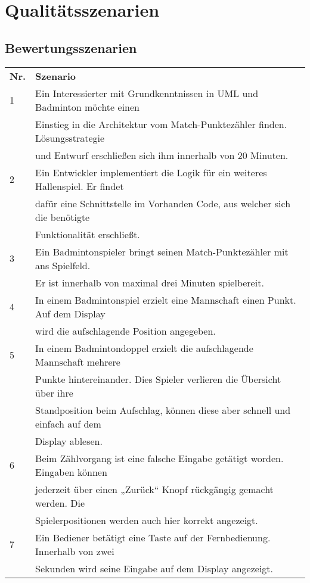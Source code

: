 \chapter{Qualitätsszenarien}

\section{Bewertungsszenarien}
\begin{center}
\begin{tabular}[h]{|l|l|}
\cline{1-2}
\textbf{Nr.} & \textbf{Szenario}\\
\cline{1-2}
1 & Ein Interessierter mit Grundkenntnissen in UML und Badminton möchte einen\\& Einstieg in die Architektur vom Match-Punktezähler finden. Lösungsstrategie\\&und Entwurf erschließen sich ihm innerhalb von 20 Minuten.\\ 
\cline{1-2}
2 & Ein Entwickler implementiert die Logik für ein weiteres Hallenspiel. Er findet\\&dafür eine Schnittstelle im Vorhanden Code, aus welcher sich die benötigte\\&Funktionalität erschließt.\\ 
\cline{1-2}
3 & Ein Badmintonspieler bringt seinen Match-Punktezähler mit ans Spielfeld.\\&Er ist innerhalb von maximal drei Minuten spielbereit.\\ 
\cline{1-2}
4 & In einem Badmintonspiel erzielt eine Mannschaft einen Punkt. Auf dem Display\\&wird die aufschlagende Position angegeben.\\ 
\cline{1-2}
5 & In einem Badmintondoppel erzielt die aufschlagende Mannschaft mehrere\\&Punkte hintereinander. Dies Spieler verlieren die Übersicht über ihre\\&Standposition beim Aufschlag, können diese aber schnell und einfach auf dem\\&Display ablesen. \\ 
\cline{1-2}
6 & Beim Zählvorgang ist eine falsche Eingabe getätigt worden. Eingaben können\\&jederzeit über einen „Zurück“ Knopf rückgängig gemacht werden. Die\\&Spielerpositionen werden auch hier korrekt angezeigt.\\ 
\cline{1-2}
7 & Ein Bediener betätigt eine Taste auf der Fernbedienung. Innerhalb von zwei\\&Sekunden wird seine Eingabe auf dem Display angezeigt.\\ 

\end{tabular}
\end{center}
